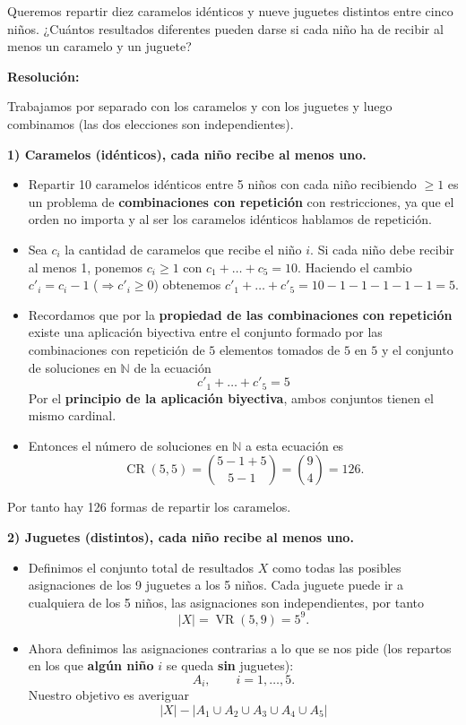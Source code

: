 \documentclass[a4paper,12pt]{article}
\begin{document}
\begin{ejercicio}[title=Ejercicio 37]
Queremos repartir diez caramelos idénticos y nueve juguetes distintos entre cinco niños.  
¿Cuántos resultados diferentes pueden darse si cada niño ha de recibir al menos un caramelo y un juguete?

\tcblower
\textbf{Resolución:}

Trabajamos por separado con los caramelos y con los juguetes y luego combinamos (las dos elecciones son independientes).

\vspace{0.5em}
\textbf{1) Caramelos (idénticos), cada niño recibe al menos uno.}

\begin{itemize}
\item Repartir 10 caramelos idénticos entre 5 niños con cada niño recibiendo $\ge 1$ es un problema de \textbf{combinaciones con repetición} con restricciones, ya que el orden no importa y al ser los caramelos idénticos hablamos de repetición.
\item Sea $c_i$ la cantidad de caramelos que recibe el niño $i$. Si cada niño debe recibir al menos 1, ponemos $c_i\ge1$ con $c_1+\dots+c_5=10$. Haciendo el cambio $c'_i=c_i-1$ (\(\Rightarrow c'_i \ge 0\)) obtenemos
  $c'_1+\dots+c'_5=10-1-1-1-1-1 = 5$.
\item Recordamos que por la \textbf{propiedad de las combinaciones con repetición} existe una aplicación biyectiva entre el conjunto formado por las combinaciones con repetición de $5$ elementos tomados de $5$ en $5$ y el conjunto de soluciones en $\mathbb{N}$ de la ecuación
\[
c'_1+\dots+c'_5= 5
\]
Por el \textbf{principio de la aplicación biyectiva}, ambos conjuntos tienen el mismo cardinal.
\item Entonces el número de soluciones en $\mathbb{N}$ a esta ecuación es
\[
\operatorname{CR}(5,5) = \binom{5-1+5}{5-1}=\binom{9}{4}=126.
\]
\end{itemize}

Por tanto hay 126 formas de repartir los caramelos.

\vspace{0.8em}

\textbf{2) Juguetes (distintos), cada niño recibe al menos uno.}

\medskip

\begin{itemize}
  \item Definimos el conjunto total de resultados $X$ como todas las posibles asignaciones de los 9 juguetes a los 5 niños.
  Cada juguete puede ir a cualquiera de los 5 niños, las asignaciones son independientes, por tanto
  \[
  |X| = \operatorname{VR}(5,9) = 5^{9}.
  \]

  \item Ahora definimos las asignaciones contrarias a lo que se nos pide (los repartos en los que \textbf{algún niño} $i$ se queda \textbf{sin} juguetes):
  \[
  A_i,\qquad i=1,\dots,5.
  \]
  Nuestro objetivo es averiguar
  \[
  |X| - |A_1\cup A_2\cup A_3\cup A_4\cup A_5|
  \]

  \end{itemize}
  \end{ejercicio}
\end{document}
